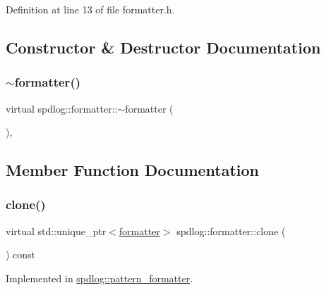 Definition at line 13 of file formatter.\+h.



\subsection{Constructor \& Destructor Documentation}
\mbox{\label{classspdlog_1_1formatter_a63ee38e660519d09020b21dd7d54d4fe}} 
\subsubsection{\texorpdfstring{$\sim$formatter()}{~formatter()}}
{\footnotesize\ttfamily virtual spdlog\+::formatter\+::$\sim$formatter (\begin{DoxyParamCaption}{ }\end{DoxyParamCaption})\hspace{0.3cm}{\ttfamily [virtual]}, {\ttfamily [default]}}



\subsection{Member Function Documentation}
\mbox{\label{classspdlog_1_1formatter_ae9857a794904d98a4a9527a742e37129}} 
\subsubsection{\texorpdfstring{clone()}{clone()}}
{\footnotesize\ttfamily virtual std\+::unique\+\_\+ptr$<$\hyperlink{classspdlog_1_1formatter}{formatter}$>$ spdlog\+::formatter\+::clone (\begin{DoxyParamCaption}{ }\end{DoxyParamCaption}) const\hspace{0.3cm}{\ttfamily [pure virtual]}}



Implemented in \hyperlink{classspdlog_1_1pattern__formatter_a73a60f53c23e860a2c1229c0781819f9}{spdlog\+::pattern\+\_\+formatter}.

\mbox{\label{classspdlog_1_1formatter_ad50e2b119d08fad952b0f885455b3bee}} 
